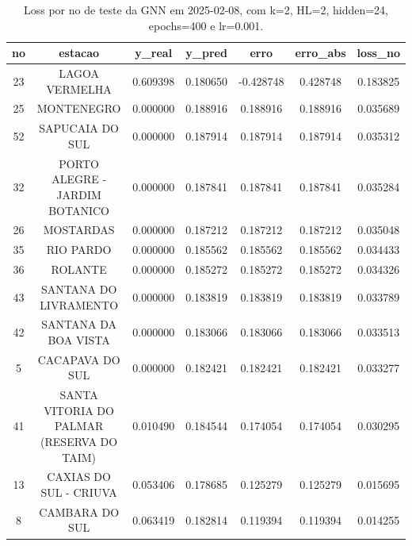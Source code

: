 \begin{table}[h]
\centering
\caption{Loss por no de teste da GNN em 2025-02-08, com k=2, HL=2, hidden=24, epochs=400 e lr=0.001.}
\label{tab:gnn_loss_k2_hl2_h24_e400_d20250208}
\begin{tabular}{ccccccc}
\toprule
no & estacao & y\_real & y\_pred & erro & erro\_abs & loss\_no \\
\midrule
23 & LAGOA VERMELHA & 0.609398 & 0.180650 & -0.428748 & 0.428748 & 0.183825 \\
25 & MONTENEGRO & 0.000000 & 0.188916 & 0.188916 & 0.188916 & 0.035689 \\
52 & SAPUCAIA DO SUL & 0.000000 & 0.187914 & 0.187914 & 0.187914 & 0.035312 \\
32 & PORTO ALEGRE - JARDIM BOTANICO & 0.000000 & 0.187841 & 0.187841 & 0.187841 & 0.035284 \\
26 & MOSTARDAS & 0.000000 & 0.187212 & 0.187212 & 0.187212 & 0.035048 \\
35 & RIO PARDO & 0.000000 & 0.185562 & 0.185562 & 0.185562 & 0.034433 \\
36 & ROLANTE & 0.000000 & 0.185272 & 0.185272 & 0.185272 & 0.034326 \\
43 & SANTANA DO LIVRAMENTO & 0.000000 & 0.183819 & 0.183819 & 0.183819 & 0.033789 \\
42 & SANTANA DA BOA VISTA & 0.000000 & 0.183066 & 0.183066 & 0.183066 & 0.033513 \\
5 & CACAPAVA DO SUL & 0.000000 & 0.182421 & 0.182421 & 0.182421 & 0.033277 \\
41 & SANTA VITORIA DO PALMAR (RESERVA DO TAIM) & 0.010490 & 0.184544 & 0.174054 & 0.174054 & 0.030295 \\
13 & CAXIAS DO SUL - CRIUVA & 0.053406 & 0.178685 & 0.125279 & 0.125279 & 0.015695 \\
8 & CAMBARA DO SUL & 0.063419 & 0.182814 & 0.119394 & 0.119394 & 0.014255 \\
\bottomrule
\end{tabular}
\end{table}
